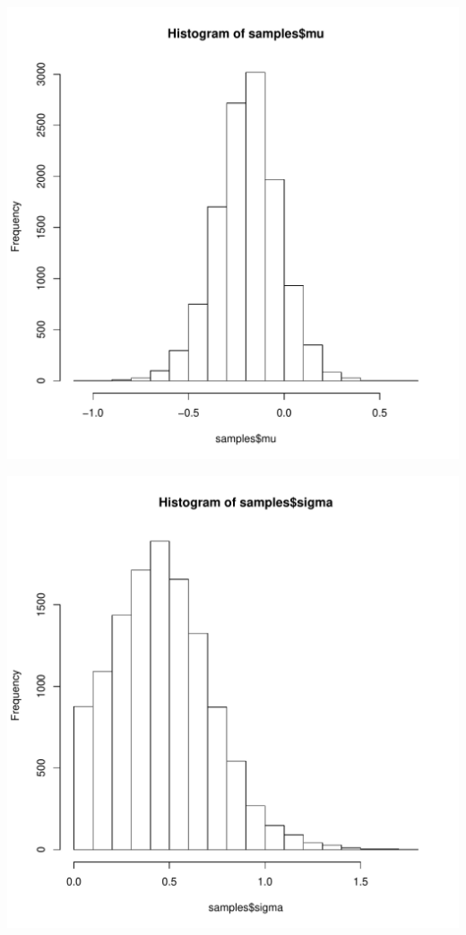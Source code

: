 \documentclass{article}\usepackage[]{graphicx}\usepackage[]{color}
\newenvironment{knitrout}{}{} %
\begin{document}






\begin{knitrout}
\color{fgcolor}
\includegraphics[width=5.5in]{figure/p3bHist-1} 

\includegraphics[width=5.5in]{figure/p3bHist-2} 


\end{knitrout}
\end{document}
